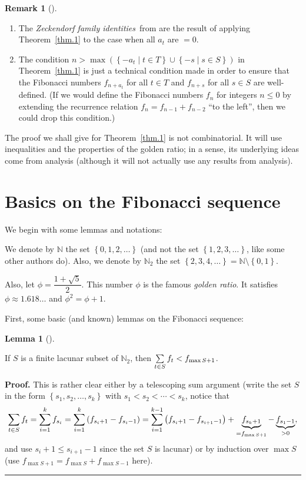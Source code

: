 \documentclass[numbers=enddot,12pt,final,onecolumn,notitlepage]{scrartcl}%
\numberwithin{exer}{section}
\theoremstyle{definition}
\newtheorem{lem}[theo]{Lemma}
\newenvironment{lemma}[1][]
{\begin{lem}[#1]\begin{leftbar}}
{\end{leftbar}\end{lem}}
\newtheorem{remk}[theo]{Remark}
\newenvironment{remark}[1][]
{\begin{remk}[#1]\begin{leftbar}}
{\end{leftbar}\end{remk}}
\newenvironment{proof}[1][Proof]{\noindent\textbf{#1.} }{\ \rule{0.5em}{0.5em}}
\let\sumnonlimits\sum
\renewcommand{\sum}{\sumnonlimits\limits}
\begin{document}
\begin{remark}
\begin{enumerate}
\item The \textit{Zeckendorf family identities}\ from \cite{1} are the result
of applying Theorem~\ref{thm.1} to the case when all $a_{t}$ are $=0$.

\item The condition $n>\max\left(  \left\{  -a_{t}\mid t\in T\right\}
\cup\left\{  -s\mid s\in S\right\}  \right)  $ in Theorem~\ref{thm.1} is just
a technical condition made in order to ensure that the Fibonacci numbers
$f_{n+a_{t}}$ for all $t\in T$ and $f_{n+s}$ for all $s\in S$ are
well-defined. (If we would define the Fibonacci numbers $f_{n}$ for integers
$n\leq0$ by extending the recurrence relation $f_{n}=f_{n-1}+f_{n-2}$ ``to the
left'', then we could drop this condition.)
\end{enumerate}
\end{remark}

The proof we shall give for Theorem~\ref{thm.1} is not combinatorial. It will
use inequalities and the properties of the golden ratio; in a sense, its
underlying ideas come from analysis (although it will not actually use any
results from analysis).

\section{Basics on the Fibonacci sequence}

We begin with some lemmas and notations:

We denote by $\mathbb{N}$ the set $\left\{  0,1,2,\ldots\right\}  $ (and not
the set $\left\{  1,2,3,\ldots\right\}  $, like some other authors do). Also,
we denote by $\mathbb{N}_{2}$ the set $\left\{  2,3,4,\ldots\right\}
=\mathbb{N}\setminus\left\{  0,1\right\}  $.

Also, let $\phi=\dfrac{1+\sqrt{5}}{2}$. This number $\phi$ is the famous
\textit{golden ratio}. It satisfies $\phi\approx1.618\ldots$ and $\phi
^{2}=\phi+1$.

First, some basic (and known) lemmas on the Fibonacci sequence:

\begin{lemma}
\label{lem.2} If $S$ is a finite lacunar subset of $\mathbb{N}_{2}$, then
$\sum\limits_{t\in S}f_{t}<f_{\max S+1}$.
\end{lemma}

\begin{proof}
This is rather clear either by a telescoping sum argument (write the set $S$
in the form $\left\{  s_{1},s_{2},\ldots,s_{k}\right\}  $ with $s_{1}%
<s_{2}<\cdots<s_{k}$, notice that
\[
\sum\limits_{t\in S}f_{t}=\sum\limits_{i=1}^{k}f_{s_{i}}=\sum\limits_{i=1}%
^{k}\left(  f_{s_{i}+1}-f_{s_{i}-1}\right)  =\sum\limits_{i=1}^{k-1}\left(
f_{s_{i}+1}-f_{s_{i+1}-1}\right)  +\underbrace{f_{s_{k}+1}}_{=f_{\max S+1}%
}-\underbrace{f_{s_{1}-1}}_{>0},
\]
and use $s_{i}+1\leq s_{i+1}-1$ since the set $S$ is lacunar) or by induction
over $\max S$ (use $f_{\max S+1}=f_{\max S}+f_{\max S-1}$ here).
\end{proof}
\end{document}
